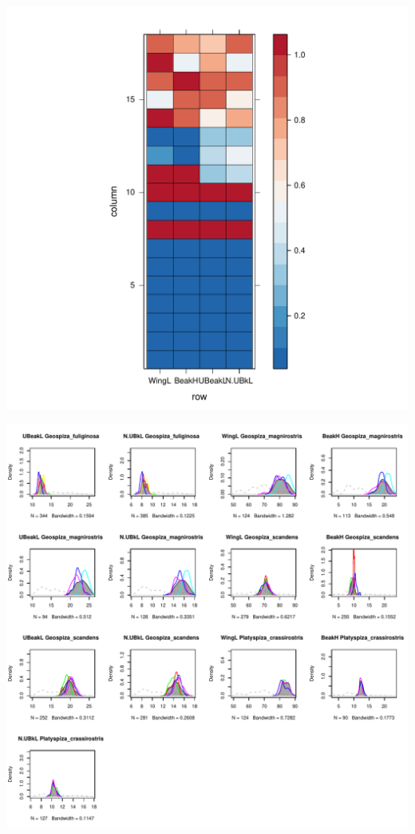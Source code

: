 \documentclass[12pt]{article}\usepackage[]{graphicx}\usepackage[]{color}
\makeatletter
\def\maxwidth{ %
  \ifdim\Gin@nat@width>\linewidth
    \linewidth
  \else
    \Gin@nat@width
  \fi
}
\newenvironment{knitrout}{}{} %
\makeatother
\begin{document}
\begin{knitrout}
\includegraphics[width=\maxwidth]{figure/unnamed-chunk-42} 

\includegraphics[width=\maxwidth]{figure/unnamed-chunk-43} 

\end{knitrout}
\end{document}

